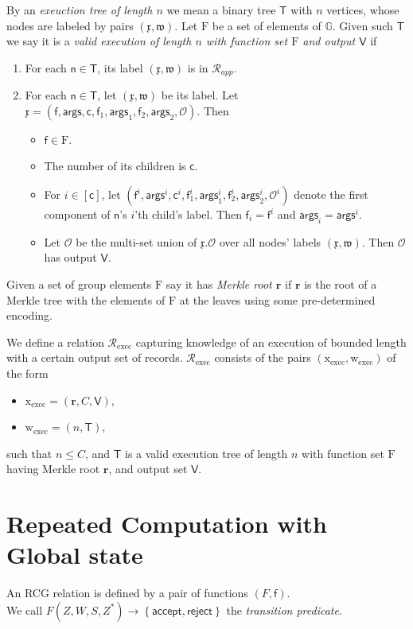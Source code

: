 \documentclass[11pt]{article} %
\newcommand{\G}{\ensuremath{{\mathbb G}}\xspace}
\newcommand{\rej}{\ensuremath{\mathsf{reject}}\xspace}
\newcommand{\acc}{\ensuremath{\mathsf{accept}}\xspace}
\newcommand{\rel}{\ensuremath{\mathcal{R}}\xspace}
\newcommand{\set}[1]{\ensuremath{\left\{#1\right\}}\xspace}
\newcommand{\f}{\ensuremath{\mathsf{f}}\xspace}
\newcommand{\relapp}{\ensuremath{\rel_{app}}\xspace}
\newcommand{\relexec}{\ensuremath{\rel_{\mathrm{exec}}}\xspace}
\newcommand{\ops}{\ensuremath{\mathcal{O}}\xspace}
\newcommand{\instapp}{\ensuremath{\mathfrak{x}}\xspace}
\newcommand{\witapp}{\ensuremath{\mathfrak{w}}\xspace}
\renewcommand{\root}{\ensuremath{\mathbf{r}}\xspace}
\newcommand{\funcs}{\ensuremath{\mathrm{F}}\xspace}
\newcommand{\instexec}{\ensuremath{\mathrm{x_{exec}}}\xspace}
\newcommand{\witexec}{\ensuremath{\mathrm{w_{exec}}}\xspace}
\newcommand{\args}{\ensuremath{\mathsf{args}}\xspace}
\newcommand{\callnum}{\ensuremath{\mathsf{c}}\xspace}
\newcommand{\recset}{\ensuremath{\mathsf{V}}\xspace}
\newcommand{\tree}{\ensuremath{\mathsf{T}}\xspace}
\newcommand{\node}{\ensuremath{\mathsf{n}}\xspace}
\newcommand{\finpred}{\ensuremath{\mathsf{f}}\xspace}
\begin{document}
By an \emph{exeuction tree of length $n$} we mean a binary tree \tree with $n$ vertices, whose nodes are
labeled by pairs $(\instapp,\witapp)$.
Let \funcs be a set of elements of \G.
Given such \tree we say it is a \emph{valid execution of length $n$ with function set \funcs and output \recset} if
\begin{enumerate}
 \item For each $\node\in\tree$, its label $(\instapp,\witapp)$ is in \relapp.
    \item For each $\node\in \tree$, let $(\instapp,\witapp)$ be its label. Let 
$\instapp= (\f,\args,\callnum, \f_1,\args_1, \f_2,\args_2,\ops)$. Then
    \begin{itemize}
    \item $\f\in \funcs$.
     \item The number of its children is \callnum.
     \item For $i\in [\callnum]$, let $(\f^i,\args^i,\callnum^i, \f^{i}_{1},\args^i_{1}, \f^i_{2},\args^i_{2},\ops^i)$ denote the first component of $\node$'s $i$'th child's label. Then $\f_i=\f^i$ and  $\args_i=\args^i$.
     \item Let \ops be the multi-set union of $\instapp.\ops$ over all nodes' labels $(\instapp,\witapp)$. Then \ops has output \recset.
     
    \end{itemize}

\end{enumerate}
Given a set of group elements \funcs say it has \emph{Merkle root \root} if \root is the root of a Merkle tree with the elements of  \funcs at the leaves using some pre-determined encoding.

We define a relation \relexec capturing knowledge of an execution of bounded length with a certain output set of records.
$\relexec$ consists of the pairs $(\instexec,\witexec)$
of the form 
\begin{itemize}
 \item $\instexec=(\root,C,\recset)$,
 \item $\witexec=(n,\tree)$,
\end{itemize}
such that $n\leq C$, and  \tree is a valid execution tree of length $n$ with function set \funcs having Merkle root \root, and output set \recset. 

\section{Repeated Computation with Global state}
An RCG relation is defined by a pair of functions $(F,\finpred)$.\\
\noindent
We call $F(Z,W,S,Z^*)\to \set{\acc,\rej}$ the \emph{transition predicate}.
\end{document}
